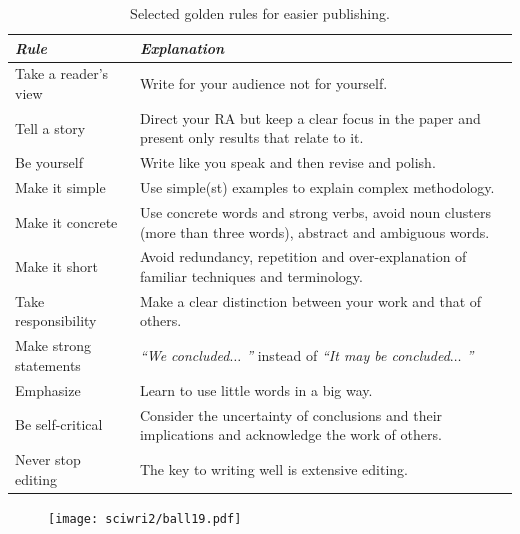 \documentclass[graybox,envcountchap,sectrefs,UStrade]{svmono}
\begin{document}
{\small
\begin{table}
\begin{center}
  \caption{Selected golden rules for easier publishing.}\label{Tbl:golden}
 \vspace{5pt}
\begin{tabular}{m{}m{}}
\toprule
\emph{Rule} & \emph{Explanation} \\
\midrule
Take a reader's view & Write for your audience not for yourself. \\
\midrule
Tell a story & Direct your RA but keep a clear focus in the paper and present only results that relate to it. \\
\midrule
Be yourself & Write like you speak and then revise and polish. \\
\midrule
Make it simple & Use simple(st) examples to explain complex methodology. \\
\midrule
Make it concrete & Use concrete words and strong verbs, avoid noun clusters (more than three words), abstract and ambiguous words. \\
\midrule
Make it short & Avoid redundancy, repetition and over-explanation of familiar techniques and terminology. \\
\midrule
Take responsibility & Make a clear distinction between your work and that of others. \\
\midrule
Make strong statements & \emph{``We concluded$\ldots$ ''} instead of \emph{``It may be concluded$\ldots$ ''} \\
\midrule
Emphasize & Learn to use little words in a big way. \\
\midrule
Be self-critical & Consider the uncertainty of conclusions and their implications and acknowledge the work of others. \\
\midrule
Never stop editing & The key to writing well is extensive editing.\\
\bottomrule
 \end{tabular}
\end{center}
\end{table}}


\begin{figure}
\vspace{-20pt}
\texttt{[image: sciwri2/ball19.pdf]}
\vspace{-20pt}
\end{figure}
\end{document}
